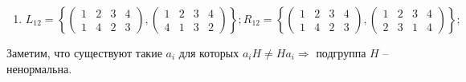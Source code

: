 \documentclass[14pt,a4paper]{scrartcl}
\begin{document}
\begin{spacing}{1}
\begin{enumerate}
		\item $L_{12} = \left\{ 
		\begin{pmatrix}
		1 & 2 & 3 & 4 \\
		1 & 4 & 2 & 3
		\end{pmatrix},
		\begin{pmatrix}
		1 & 2 & 3 & 4 \\
		4 & 1 & 3 & 2
		\end{pmatrix}
		\right\};
		R_{12} = \left\{ 
		\begin{pmatrix}
		1 & 2 & 3 & 4 \\
		1 & 4 & 2 & 3
		\end{pmatrix},
		\begin{pmatrix}
		1 & 2 & 3 & 4 \\
		2 & 3 & 1 & 4
		\end{pmatrix}
		\right\};$
	\end{enumerate}
	Заметим, что существуют такие $a_i$ для которых $a_iH \neq Ha_i \Rightarrow$ подгруппа $H$ -- ненормальна.
	

\end{spacing}
\end{document}
